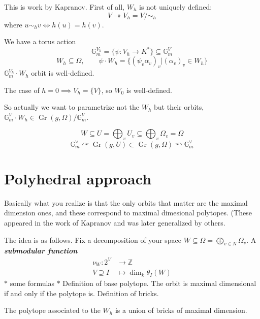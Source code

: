 This is work by Kapranov. First of all, $W_h$ is not uniquely defined:
\[V\twoheadrightarrow V_h=V/\sim_h\]
where $u\sim_h v\iff h(u)=h(v)$.

We have a torus action
\[\mathbb{G}^{V_h}_m=\{\psi:V_h\longrightarrow K^*\} \subseteq \mathbb{G}^V_m\]
\[W_h\subseteq \Omega,\qquad \psi\cdot W_h=\{(\psi_v\alpha_v)_v|(\alpha_v)_v\in W_h\}\]
$\mathbb{G}^{V_h}_m\cdot W_h$ orbit is well-defined.

The case of $h=0\implies V_h=\{V\}$, so $W_0$ is well-defined.

So actually we want to parametrize not the $W_h$ but their orbits, $\mathbb{G}^V_m\cdot W_h\in \operatorname{Gr}(g,\Omega)/\mathbb{G}^V_m$.

\[W\subseteq U=\bigoplus_{v} U_v\subseteq \bigoplus_{v} \Omega_v=\Omega \]
\[\mathbb{G}^\vee_m\curvearrowright\operatorname{Gr}(g,U)\subset \operatorname{Gr}(g,\Omega)\curvearrowleft \mathbb{G}^\vee_m\]

\section{Polyhedral approach}
Basically what you realize is that the only orbits that matter are the maximal dimension ones, and these correspond to maximal dimesional polytopes. (These appeared in the work of Kapranov and was later generalized by others.

The idea is as follows. Fix a decomposition of your space $W\subseteq \Omega=\bigoplus_{v\in N} \Omega_v $. A \textit{\textbf{submodular function}}
\begin{align*}
	\nu_W: 2^V &\longrightarrow \mathbb{Z} \\
	V\supseteq I &\longmapsto \dim_k\theta_I(W)
\end{align*}
$*$ some formulas $*$ Definition of base polytope. The orbit is maximal dimensional if and only if the polytope is. Definition of bricks.

\begin{thm}\leavevmode
	The polytope associated to the $W_h$ is a union of bricks of maximal dimension.
\end{thm}


